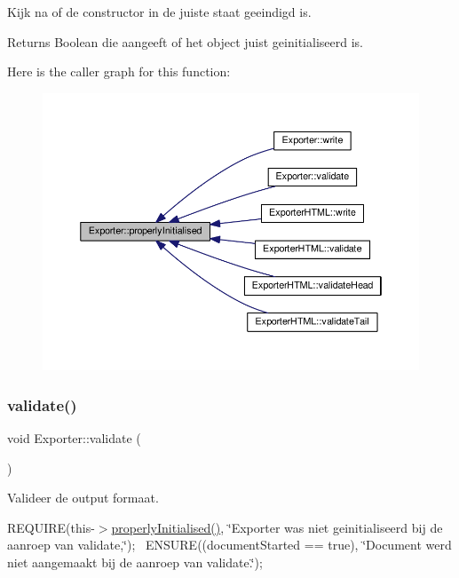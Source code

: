 Kijk na of de constructor in de juiste staat geeindigd is. 

\begin{DoxyReturn}{Returns}
Boolean die aangeeft of het object juist geinitialiseerd is. 
\end{DoxyReturn}
Here is the caller graph for this function\+:
\nopagebreak
\begin{figure}[H]
\begin{center}
\leavevmode
\includegraphics[width=350pt]{class_exporter_aafd9df9210aeefd7bb7fd434fc317cf0_icgraph}
\end{center}
\end{figure}
\mbox{\label{class_exporter_a190fe737bcda2a55707ae51b731d11a5}} 
\subsubsection{\texorpdfstring{validate()}{validate()}}
{\footnotesize\ttfamily void Exporter\+::validate (\begin{DoxyParamCaption}{ }\end{DoxyParamCaption})\hspace{0.3cm}{\ttfamily [virtual]}}



Valideer de output formaat. 

R\+E\+Q\+U\+I\+RE(this-\/$>$\hyperlink{class_exporter_aafd9df9210aeefd7bb7fd434fc317cf0}{properly\+Initialised()}, \char`\"{}\+Exporter was niet geinitialiseerd bij de aanroep van validate,\char`\"{});~\newline
E\+N\+S\+U\+RE((document\+Started == true), \char`\"{}\+Document werd niet aangemaakt bij de aanroep van validate.\char`\"{});~\newline



